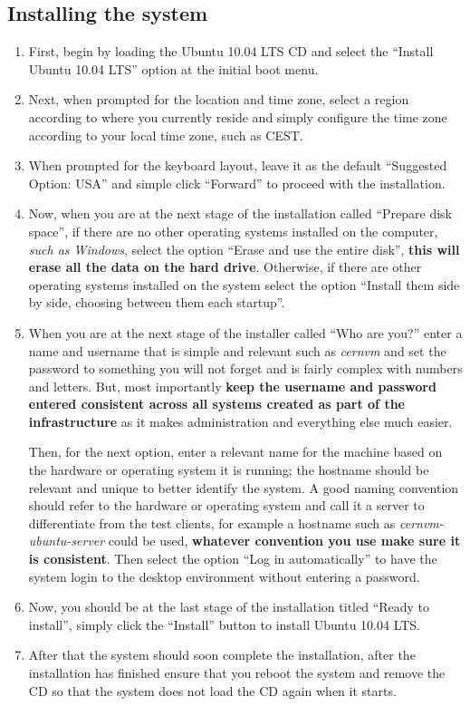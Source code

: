 \subsection{Installing the system}
\label{sec:ubuntuinstall}
\flushleft
\begin{enumerate}
\item 	First, begin by loading the Ubuntu 10.04 LTS CD and select the ``Install Ubuntu 10.04 LTS'' option at the initial boot menu.

\item 	Next, when prompted for the location and time zone, select a region according to where you currently reside and simply configure 
		the time zone according to your local time zone, such as CEST.

\item	When prompted for the keyboard layout, leave it as the default ``Suggested Option: USA'' and simple click ``Forward'' to proceed
		with the installation.
		
\item	Now, when you are at the next stage of the installation called ``Prepare disk space'', if there are no other operating systems 		
		installed on the computer, \emph{such as Windows}, select the option ``Erase and use the entire disk'', {\bf this will erase
		all the data on the hard drive}. Otherwise, if there are other operating systems installed on the system select the option 
		``Install them side by side, choosing between them each startup''.
		 
\item 	When you are at the next stage of the installer called ``Who are you?'' enter a name and username that is simple and 
		relevant such as \emph{cernvm} and set the password to something you will not forget and is fairly complex with numbers and
		letters. But, most importantly {\bf keep the username and password entered consistent across all systems created as part of 
		the infrastructure} as it makes administration and everything else much easier.
		
		Then, for the next option, enter a relevant name for the machine based on the hardware or operating system it is running; the
		hostname should be relevant and unique to better identify the system. A good naming convention should refer to the hardware or 
		operating system and call it a server to differentiate from the test clients, for example a hostname such as 
		\emph{cernvm-ubuntu-server} could be used, {\bf whatever convention you use make sure it is consistent}. Then select the option 
		``Log in automatically'' to have the system login to the desktop environment without entering a password. 

\item	Now, you should be at the last stage of the installation titled ``Ready to install'', simply click the ``Install''
		button to install Ubuntu 10.04 LTS.

\item	After that the system should soon complete the installation, after the installation has finished ensure that you reboot the 
		system and remove the CD so that the system does not load the CD again when it starts.
\end{enumerate}


